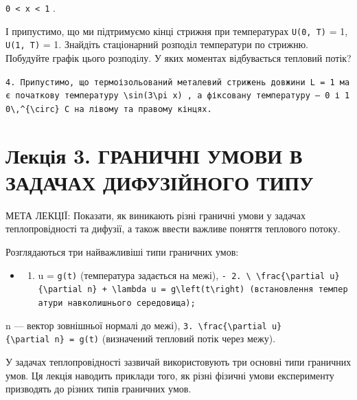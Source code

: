 \documentclass[
  ukrainian,
]{article}
\providecommand{\tightlist}{%
  \setlength{\itemsep}{0pt}\setlength{\parskip}{0pt}}
\begin{document}
\texttt{0\ \textless{}\ x\ \textless{}\ 1} .

І припустимо, що ми підтримуємо кінці стрижня при температурах
\texttt{U(0,\ T)} = 1, \texttt{U(1,\ T)} = 1. Знайдіть стаціонарний
розподіл температури по стрижню. Побудуйте графік цього розподілу. У
яких моментах відбувається тепловий потік?

\texttt{4.\ Припустимо,\ що\ термоізольований\ металевий\ стрижень\ довжини\ L\ =\ 1\ має\ початкову\ температуру\ \textquotesingle{}\textbackslash{}sin(3\textbackslash{}pi\ x)\textquotesingle{}\ ,\ а\ фіксовану\ температуру\ —\ 0\ і\ \textquotesingle{}10\textbackslash{},\^{}\{\textbackslash{}circ\}\textquotesingle{}\ C\ на\ лівому\ та\ правому\ кінцях.}

\section{Лекція 3. ГРАНИЧНІ УМОВИ В ЗАДАЧАХ ДИФУЗІЙНОГО
ТИПУ}\label{ux43bux435ux43aux446ux456ux44f-3.-ux433ux440ux430ux43dux438ux447ux43dux456-ux443ux43cux43eux432ux438-ux432-ux437ux430ux434ux430ux447ux430ux445-ux434ux438ux444ux443ux437ux456ux439ux43dux43eux433ux43e-ux442ux438ux43fux443}

МЕТА ЛЕКЦІЇ: Показати, як виникають різні граничні умови у задачах
теплопровідності та дифузії, а також ввести важливе поняття теплового
потоку.

Розглядаються три найважливіші типи граничних умов:

\begin{itemize}
\tightlist
\item
  \begin{enumerate}
  \def\labelenumi{\arabic{enumi}.}
  \tightlist
  \item
    u = \texttt{g(t)} (температура задається на межі),
    \texttt{-\ \textquotesingle{}2.\ \textbackslash{}\ \textbackslash{}frac\{\textbackslash{}partial\ u\}\{\textbackslash{}partial\ n\}\ +\ \textbackslash{}lambda\ u\ =\ g\textbackslash{}left(t\textbackslash{}right)\textquotesingle{}\ (встановлення\ температури\ навколишнього\ середовища);}
  \end{enumerate}
\end{itemize}

n --- вектор зовнішньої нормалі до межі),
\texttt{3.\ \textbackslash{}frac\{\textbackslash{}partial\ u\}\{\textbackslash{}partial\ n\}\ =\ g(t)}
(визначений тепловий потік через межу).

У задачах теплопровідності зазвичай використовують три основні типи
граничних умов. Ця лекція наводить приклади того, як різні фізичні умови
експерименту призводять до різних типів граничних умов.
\end{document}
